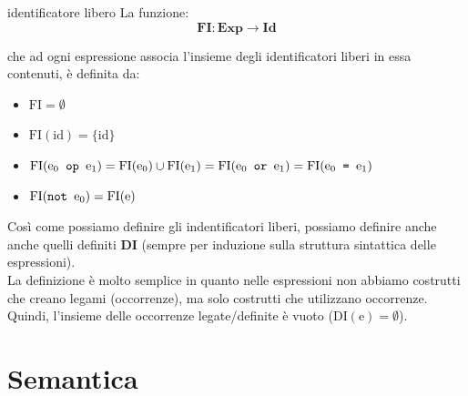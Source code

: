 \begin{mydef}{identificatore libero}
    La funzione:
    \[
        \mathbf{FI} : \mathbf{Exp} \to \mathbf{Id}
    \]

    che ad ogni espressione associa l'insieme degli identificatori liberi in essa contenuti, è definita da:
    \begin{itemize}[label=$\triangleright$, itemsep=\smallskipamount]
        \item $\mathrm{FI} = \emptyset$
        \item $\mathrm{FI}(\mathrm{id}) = \{\mathrm{id}\}$
        \item $\mathrm{FI}(\mathrm{e_0} \verb| op | \mathrm{e_1}) = \mathrm{FI}(\mathrm{e_0}) \cup \mathrm{FI}(\mathrm{e_1}) = \mathrm{FI}(\mathrm{e_0} \verb| or | \mathrm{e_1}) = \mathrm{FI}(\mathrm{e_0} \verb| = | \mathrm{e_1})$
        \item $\mathrm{FI}(\verb|not | \mathrm{e_0}) = \mathrm{FI}(\mathrm{e})$
    \end{itemize}
\end{mydef}


Così come possiamo definire gli indentificatori liberi, possiamo definire anche anche quelli definiti $\mathbf{DI}$ (sempre per induzione sulla struttura sintattica delle espressioni).\\[0.2ex]
La definizione è molto semplice in quanto nelle espressioni non abbiamo costrutti che creano legami (occorrenze), ma solo costrutti che utilizzano occorrenze.\\[0.2ex]
Quindi, l'insieme delle occorrenze legate/definite è vuoto ($\mathrm{DI(e)} = \emptyset$).

\section{Semantica}

